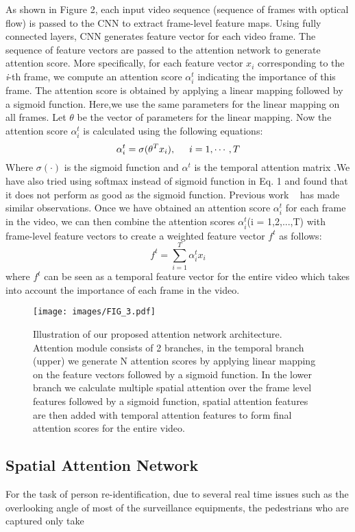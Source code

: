 \documentclass[sigconf, authordraft,review=false]{acmart}
\begin{document}
As  shown in  Figure  2,  each  input video  sequence  (sequence of frames with optical flow) is passed to the CNN to extract frame-level feature maps.  Using fully connected
layers, CNN generates feature vector for each video frame.
The sequence of feature vectors are passed to the attention
network to generate attention score.  More specifically, for
each feature vector $x_i$ corresponding to the \textit{i}-th frame, we compute an attention score \(\alpha\)$^t_i$ indicating the importance of this frame.   The attention score is obtained by applying a linear mapping followed by a sigmoid function.   Here,we
use the same parameters for the linear mapping on all
frames.   Let \(\theta\) be  the  vector  of  parameters  for  the  linear mapping. Now  the  attention  score \(\alpha\)$_i^t$  is  calculated  using the following equations:
\begin{equation}
\alpha_i^t=\sigma(\theta^Tx_i), \hspace{0.5cm}i=1,\cdots,T
\end{equation}Where $\sigma(\cdot)$ is the sigmoid function and $\alpha^t$ is the temporal attention matrix .We  have  also  tried  using  softmax  instead  of  sigmoid
function in Eq. 1 and found that it does not perform as good
as the sigmoid function. Previous work ~\cite{zhao2017_deeply} has made similar observations. Once we have obtained an attention score \(\alpha\)$_i^t$
for each frame in the video,  we can then combine the
attention scores \(\alpha\)$_i^t$(i = 1,2,...,T)  with frame-level feature
vectors to create a weighted feature vector
$f^t$
as follows:
\begin{equation}
f^t=\sum_{i=1}^{T} \alpha^t_ix_i
\end{equation}
where
$f^t$
can be seen as a temporal feature vector for the entire video
which takes into account the importance of each frame in
the video.
\begin{figure*}
\texttt{[image: images/FIG\_3.pdf]}
\caption{Illustration of our proposed attention network architecture. Attention module consists of 2 branches, in the temporal branch (upper) we generate N attention scores by applying linear mapping on the feature vectors followed by a sigmoid function. In the lower branch we calculate multiple spatial attention over the frame level features followed by a sigmoid function, spatial attention features are then added with temporal attention features to form final attention scores for the entire video.}
\end{figure*}\subsection{Spatial Attention Network}For the task of  person  re-identification,  due  to  several real time issues such as the  overlooking  angle of most of the surveillance equipments, the pedestrians who are captured only take
\end{document}
